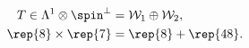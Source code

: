 \begin{equation}
\begin{aligned}
   T \in \Lambda^1 \otimes \spin^\perp 
      &= \mathcal{W}_1 \oplus \mathcal{W}_2 , \\
   \rep{8} \times \rep{7} &= \rep{8} + \rep{48} . 
\end{aligned}
\end{equation}

